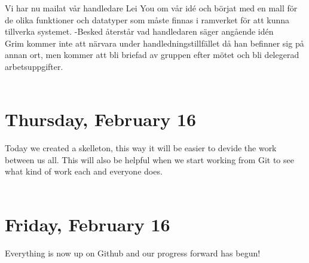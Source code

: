\documentclass[11pt]{article}
\begin{document}
Vi har nu mailat vår handledare Lei You om vår idé och börjat med en mall för de olika funktioner och datatyper som måste finnas i ramverket för att kunna tillverka systemet.
-Besked återstår vad handledaren säger angående idén\\

Grim kommer inte att närvara under handledningstillfället då han befinner sig på annan ort, men kommer att bli briefad av gruppen efter mötet och bli delegerad arbetsuppgifter.\\\\
\section*{Thursday, February 16}
Today we created a skelleton, this way it will be easier to devide the work between us all. This will also be helpful when we start working from Git to see what kind of work each and everyone does.\\\\

\section*{Friday, February 16}
Everything is now up on Github and our progress forward has begun!
\end{document}
